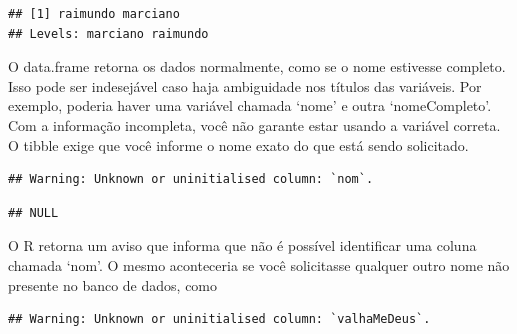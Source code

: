 \documentclass[
]{book}
\newenvironment{Shaded}{\begin{snugshade}}{\end{snugshade}}
\newcommand{\CommentTok}[1]{\textcolor[rgb]{0.56,0.35,0.01}{\textit{#1}}}
\newcommand{\NormalTok}[1]{#1}
\newcommand{\OperatorTok}[1]{\textcolor[rgb]{0.81,0.36,0.00}{\textbf{#1}}}
\begin{document}
\begin{Shaded}
\end{Shaded}

\begin{verbatim}
## [1] raimundo marciano
## Levels: marciano raimundo
\end{verbatim}

O data.frame retorna os dados normalmente, como se o nome estivesse completo. Isso pode ser indesejável caso haja ambiguidade nos títulos das variáveis. Por exemplo, poderia haver uma variável chamada `nome' e outra `nomeCompleto'. Com a informação incompleta, você não garante estar usando a variável correta. O tibble exige que você informe o nome exato do que está sendo solicitado.

\begin{Shaded}
\end{Shaded}

\begin{verbatim}
## Warning: Unknown or uninitialised column: `nom`.
\end{verbatim}

\begin{verbatim}
## NULL
\end{verbatim}

O R retorna um aviso que informa que não é possível identificar uma coluna chamada `nom'. O mesmo aconteceria se você solicitasse qualquer outro nome não presente no banco de dados, como

\begin{Shaded}
\end{Shaded}

\begin{verbatim}
## Warning: Unknown or uninitialised column: `valhaMeDeus`.
\end{verbatim}
\end{document}
